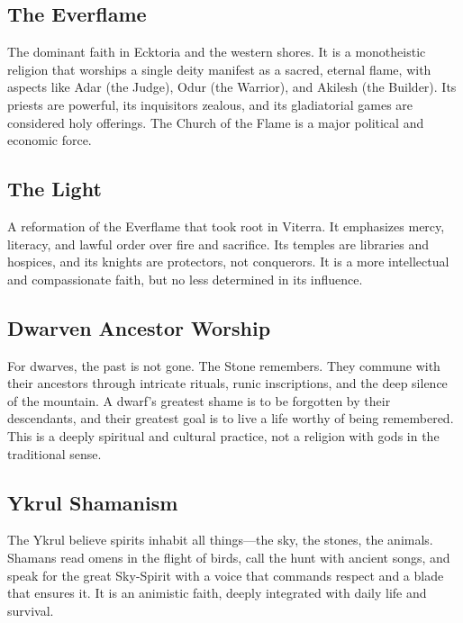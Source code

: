 \subsection*{The Everflame}

The dominant faith in Ecktoria and the western shores. It is a monotheistic religion that worships a single deity manifest as a sacred, eternal flame, with aspects like Adar (the Judge), Odur (the Warrior), and Akilesh (the Builder). Its priests are powerful, its inquisitors zealous, and its gladiatorial games are considered holy offerings. The Church of the Flame is a major political and economic force.

\subsection*{The Light}

A reformation of the Everflame that took root in Viterra. It emphasizes mercy, literacy, and lawful order over fire and sacrifice. Its temples are libraries and hospices, and its knights are protectors, not conquerors. It is a more intellectual and compassionate faith, but no less determined in its influence.

\subsection*{Dwarven Ancestor Worship}

For dwarves, the past is not gone. The Stone remembers. They commune with their ancestors through intricate rituals, runic inscriptions, and the deep silence of the mountain. A dwarf's greatest shame is to be forgotten by their descendants, and their greatest goal is to live a life worthy of being remembered. This is a deeply spiritual and cultural practice, not a religion with gods in the traditional sense.

\subsection*{Ykrul Shamanism}

The Ykrul believe spirits inhabit all things—the sky, the stones, the animals. Shamans read omens in the flight of birds, call the hunt with ancient songs, and speak for the great Sky-Spirit with a voice that commands respect and a blade that ensures it. It is an animistic faith, deeply integrated with daily life and survival.


